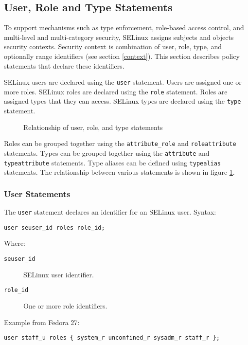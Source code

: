 \subsection{User, Role and Type Statements}
\label{userroletype}
To support mechanisms such as type enforcement, role-based access control, and
multi-level and multi-category security, SELinux assigns subjects and objects
security contexts. Security context is combination of user, role, type, and
optionally range identifiers (see section \ref{context}). This section describes
policy statements that declare these identifiers.

SELinux users are declared using the \texttt{user} statement. Users are assigned
one or more roles. SELinux roles are declared using the \texttt{role} statement.
Roles are assigned types that they can access. SELinux types are declared using
the \texttt{type} statement.

\begin{figure}
    \centering
    \label{fig:userroletype}
    
    \caption{Relationship of user, role, and type statements}
\end{figure}

Roles can be grouped together using the \texttt{attribute\_role} and
\texttt{roleattribute} statements. Types can be grouped together using the
\texttt{attribute} and \texttt{typeattribute} statements. Type aliases can be
defined using \texttt{typealias} statements. The relationship between various
statements is shown in figure \ref{fig:userroletype}.

\subsubsection{User Statements}
The \texttt{user} statement declares an identifier for an SELinux user. Syntax:
\begin{lstlisting}[language=te]
user seuser_id roles role_id;
\end{lstlisting}
Where:
\begin{description}
    \item [\texttt{seuser\_id}] SELinux user identifier.
    \item [\texttt{role\_id}] One or more role identifiers.
\end{description}
Example from Fedora 27:
\begin{lstlisting}[language=te]
user staff_u roles { system_r unconfined_r sysadm_r staff_r };
\end{lstlisting}

